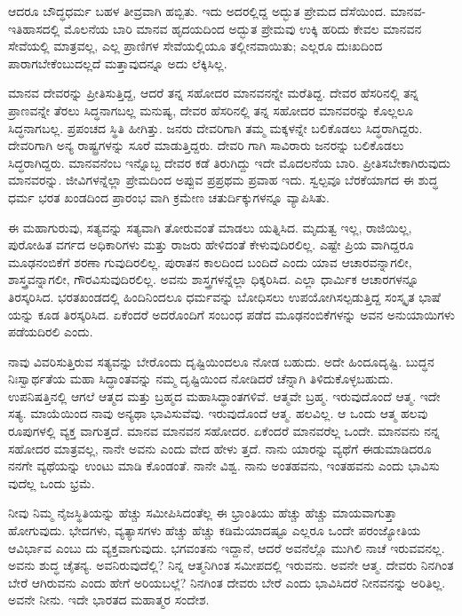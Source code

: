 ಆದರೂ ಬೌದ್ಧಧರ್ಮ ಬಹಳ ತೀವ್ರವಾಗಿ ಹಬ್ಬಿತು. ಇದು ಅದರಲ್ಲಿದ್ದ ಅದ್ಭುತ ಪ್ರೇಮದ ದೆಸೆಯಿಂದ. ಮಾನವ-ಇತಿಹಾಸದಲ್ಲಿ ಮೊಲನೆಯ ಬಾರಿ ಮಾನವ ಹೃದಯದಿಂದ ಅದ್ಭುತ ಪ್ರೇಮವು ಉಕ್ಕಿ ಹರಿದು ಕೇವಲ ಮಾನವನ ಸೇವೆಯಲ್ಲಿ ಮಾತ್ರವಲ್ಲ, ಎಲ್ಲ ಪ್ರಾಣಿಗಳ ಸೇವೆಯಲ್ಲಿಯೂ ತಲ್ಲೀನವಾಯಿತು; ಎಲ್ಲರೂ ದುಃಖದಿಂದ ಪಾರಾಗಬೇಕೆಂಬುದಲ್ಲದೆ ಮತ್ತಾವುದನ್ನೂ ಅದು ಲೆಕ್ಕಿಸಿಲ್ಲ.

ಮಾನವ ದೇವರನ್ನು ಪ್ರೀತಿಸುತ್ತಿದ್ದ, ಆದರೆ ತನ್ನ ಸಹೋದರ ಮಾನವನನ್ನೇ ಮರೆತಿದ್ದ. ದೇವರ ಹೆಸರಿನಲ್ಲಿ ತನ್ನ ಪ್ರಾಣವನ್ನೇ ತೆರಲು ಸಿದ್ಧನಾಗಬಲ್ಲ ಮನುಷ್ಯ, ದೇವರ ಹೆಸರಿನಲ್ಲಿ ತನ್ನ ಸಹೋದರ ಮಾನವರನ್ನು ಕೊಲ್ಲಲೂ ಸಿದ್ಧನಾಗಬಲ್ಲ. ಪ್ರಪಂಚದ ಸ್ಥಿತಿ ಹೀಗಿತ್ತು. ಜನರು ದೇವರಿಗಾಗಿ ತಮ್ಮ ಮಕ್ಕಳನ್ನೇ ಬಲಿಕೊಡಲು ಸಿದ್ಧರಾಗಿದ್ದರು. ದೇವರಿಗಾಗಿ ಅನ್ಯ ರಾಷ್ಟ್ರಗಳನ್ನು ಸೂರೆ ಮಾಡುತ್ತಿದ್ದರು. ದೇವರಿ ಗಾಗಿ ಸಾವಿರಾರು ಜನರನ್ನು ಬಲಿಕೊಡಲು ಸಿದ್ಧರಾಗಿದ್ದರು. ಮಾನವನೆಂಬ ಇನ್ನೊಬ್ಬ ದೇವರ ಕಡೆ ತಿರುಗಿದ್ದು ಇದೇ ಮೊದಲನೆಯ ಬಾರಿ. ಪ್ರೀತಿಸಬೇಕಾಗಿರುವುದು ಮಾನವರನ್ನು. ಜೀವಿಗಳನ್ನೆಲ್ಲಾ ಪ್ರೇಮದಿಂದ ಅಪ್ಪುವ ಪ್ರಪ್ರಥಮ ಪ್ರವಾಹ ಇದು. ಸ್ವಲ್ಪವೂ ಬೆರಕೆಯಾಗದ ಈ ಶುದ್ಧ ಧರ್ಮ ಭರತ ಖಂಡದಿಂದ ಪ್ರಾರಂಭ ವಾಗಿ ಕ್ರಮೇಣ ಚತುರ್ದಿಕ್ಕುಗಳನ್ನೂ ವ್ಯಾಪಿಸಿತು.

ಈ ಮಹಾಗುರುವು, ಸತ್ಯವನ್ನು ಸತ್ಯವಾಗಿ ತೋರುವಂತೆ ಮಾಡಲು ಯತ್ನಿಸಿದ. ಮೃದುತ್ವ ಇಲ್ಲ, ರಾಜಿಯಿಲ್ಲ, ಪುರೋಹಿತ ವರ್ಗದ ಅಧಿಕಾರಿಗಳು ಮತ್ತು ರಾಜರು ಹೇಳಿದಂತೆ ಕೇಳುವುದಿರಲಿಲ್ಲ. ಎಷ್ಟೇ ಪ್ರಿಯ ವಾಗಿದ್ದರೂ ಮೂಢನಂಬಿಕೆಗೆ ಶರಣಾ ಗುವುದಿರಲಿಲ್ಲ. ಪುರಾತನ ಕಾಲದಿಂದ ಬಂದಿದೆ ಎಂದು ಯಾವ ಆಚಾರವನ್ನಾಗಲೀ, ಶಾಸ್ತ್ರವನ್ನಾಗಲೀ, ಗೌರವಿಸುವುದಿರಲಿಲ್ಲ. ಅವನು ಶಾಸ್ತ್ರಗಳನ್ನೆಲ್ಲಾ ಧಿಕ್ಕರಿಸಿದ. ಎಲ್ಲಾ ಧಾರ್ಮಿಕ ಆಚಾರಗಳನ್ನೂ ತಿರಸ್ಕರಿಸಿದ. ಭರತಖಂಡದಲ್ಲಿ ಹಿಂದಿನಿಂದಲೂ ಧರ್ಮವನ್ನು ಬೋಧಿಸಲು ಉಪಯೋಗಿಸಲ್ಪಡುತ್ತಿದ್ದ ಸಂಸ್ಕೃತ ಭಾಷೆ ಯನ್ನು ಕೂಡ ತಿರಸ್ಕರಿಸಿದ. ಏಕೆಂದರೆ ಅದರೊಂದಿಗೆ ಸಂಬಂಧ ಪಡೆದ ಮೂಢನಂಬಿಕೆಗಳನ್ನು ಅವನ ಅನುಯಾಯಿಗಳು ಪಡೆಯದಿರಲಿ ಎಂದು.

ನಾವು ವಿವರಿಸುತ್ತಿರುವ ಸತ್ಯವನ್ನು ಬೇರೊಂದು ದೃಷ್ಟಿಯಿಂದಲೂ ನೋಡ ಬಹುದು. ಅದೇ ಹಿಂದೂದೃಷ್ಟಿ. ಬುದ್ಧನ ನಿಃಸ್ವಾರ್ಥತೆಯ ಮಹಾ ಸಿದ್ಧಾಂತವನ್ನು ನಮ್ಮ ದೃಷ್ಟಿಯಿಂದ ನೋಡಿದರೆ ಚೆನ್ನಾಗಿ ತಿಳಿದುಕೊಳ್ಳಬಹುದು. ಉಪನಿಷತ್ತಿನಲ್ಲಿ ಆಗಲೆ ಆತ್ಮದ ಮತ್ತು ಬ್ರಹ್ಮದ ಮಹಾಸಿದ್ಧಾಂತಗಳಿವೆ. ಆತ್ಮವೇ ಬ್ರಹ್ಮ. ಇರುವುದೊಂದೆ ಆತ್ಮ. ಇದೇ ಸತ್ಯ. ಮಾಯೆಯಿಂದ ನಾವು ಅನ್ಯಥಾ ಭಾವಿಸುವೆವು. ಇರುವುದೊಂದೆ ಆತ್ಮ. ಹಲವಿಲ್ಲ. ಆ ಒಂದು ಆತ್ಮ ಹಲವು ರೂಪುಗಳಲ್ಲಿ ವ್ಯಕ್ತ ವಾಗುತ್ತದೆ. ಮಾನವ ಮಾನವನ ಸಹೋದರ. ಏಕೆಂದರೆ ಮಾನವರೆಲ್ಲ ಒಂದೇ. ಮಾನವನು ನನ್ನ ಸಹೋದರ ಮಾತ್ರವಲ್ಲ, ನಾನೇ ಅವನು ಎಂದು ವೇದ ಹೇಳು ತ್ತದೆ. ನಾನು ಯಾರನ್ನು ವ್ಯಥೆಗೆ ಈಡುಮಾಡಿದರೂ ನನಗೇ ವ್ಯಥೆಯನ್ನು ಉಂಟು ಮಾಡಿ ಕೊಂಡಂತೆ. ನಾನೇ ವಿಶ್ವ. ನಾನು ಅಂತಹವನು, ಇಂತಹವನು ಎಂದು ಭಾವಿಸು ವುದೆಲ್ಲ ಒಂದು ಭ್ರಮೆ.

ನೀವು ನಿಮ್ಮ ನೈಜಸ್ಥಿತಿಯನ್ನು ಹೆಚ್ಚು ಸಮೀಪಿಸಿದಂತೆಲ್ಲ ಈ ಭ್ರಾಂತಿಯು ಹೆಚ್ಚು ಹೆಚ್ಚು ಮಾಯವಾಗುತ್ತಾ ಹೋಗುವುದು. ಭೇದಗಳು, ವ್ಯತ್ಯಾಸಗಳು ಹೆಚ್ಚು ಹೆಚ್ಚು ಕಡಿಮೆಯಾದಷ್ಟೂ ಎಲ್ಲರೂ ಒಂದೇ ಪರಂಜ್ಯೋತಿಯ ಆವಿರ್ಭಾವ ಎಂಬು ದು ವ್ಯಕ್ತವಾಗುವುದು. ಭಗವಂತನು ಇದ್ದಾನೆ, ಆದರೆ ಅವನೆಲ್ಲೊ ಮುಗಿಲಿ ನಾಚೆ ಇರುವವನಲ್ಲ. ಅವನು ಶುದ್ಧ ಚೈತನ್ಯ. ಅವನಿರುವುದೆಲ್ಲಿ? ನಿನ್ನ ಆತ್ಮನಿಗಿಂತ ಸಮೀಪದಲ್ಲಿ ಇರುವನು. ಅವನೇ ಆತ್ಮ. ದೇವರು ನಿನಗಿಂತ ಬೇರೆ ಆಗಿರುವನು ಎಂದು ಹೇಗೆ ಅರಿಯಬಲ್ಲೆ? ನಿನಗಿಂತ ದೇವರು ಬೇರೆ ಎಂದು ಭಾವಿಸಿದರೆ ನೀನವನನ್ನು ಅರಿತಿಲ್ಲ. ಅವನೇ ನೀನು. ಇದೇ ಭಾರತದ ಮಹಾತ್ಮರ ಸಂದೇಶ.

